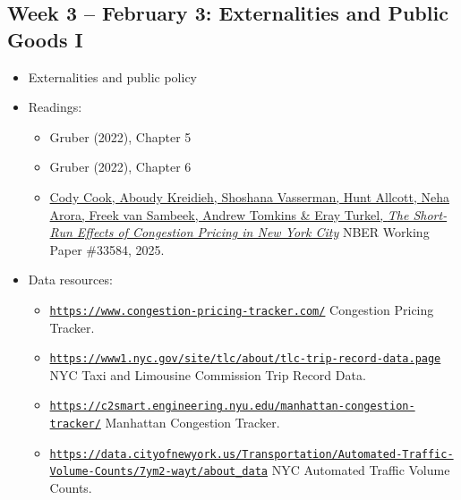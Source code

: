 \documentclass[11pt]{article}
\begin{document}
\subsection*{Week 3 -- February 3: Externalities and Public Goods I}
\begin{itemize}
    \setlength{\itemsep}{0em}
    \item Externalities and public policy
    \item Readings:
    \begin{itemize}
        \item Gruber (2022), Chapter 5
        \item Gruber (2022), Chapter 6
        \item \href{https://www.nber.org/papers/w33584}{Cody Cook, Aboudy Kreidieh, Shoshana Vasserman, Hunt Allcott, Neha Arora, Freek van Sambeek, Andrew Tomkins \& Eray Turkel, \textit{The Short-Run Effects of Congestion Pricing in New York City}} NBER Working Paper \#33584, 2025.
    \end{itemize}
    \item Data resources:
    \begin{itemize}
    \setlength{\itemsep}{0em}
        \item \href{https://www.congestion-pricing-tracker.com/}{\nolinkurl{https://www.congestion-pricing-tracker.com/}} Congestion Pricing Tracker.
        \item \href{https://www1.nyc.gov/site/tlc/about/tlc-trip-record-data.page}{\nolinkurl{https://www1.nyc.gov/site/tlc/about/tlc-trip-record-data.page}} NYC Taxi and Limousine Commission Trip Record Data.
        \item \href{https://c2smart.engineering.nyu.edu/manhattan-congestion-tracker/}{\nolinkurl{https://c2smart.engineering.nyu.edu/manhattan-congestion-tracker/}} Manhattan Congestion Tracker.
        \item \href{https://data.cityofnewyork.us/Transportation/Automated-Traffic-Volume-Counts/7ym2-wayt/about_data}{\nolinkurl{https://data.cityofnewyork.us/Transportation/Automated-Traffic-Volume-Counts/7ym2-wayt/about_data}} NYC Automated Traffic Volume Counts.
    \end{itemize} 
\end{itemize}
\end{document}
